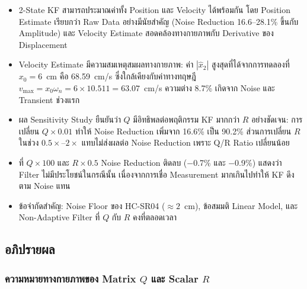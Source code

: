 \begin{itemize}
    \item 2-State KF สามารถประมาณค่าทั้ง Position และ Velocity ได้พร้อมกัน
          โดย Position Estimate เรียบกว่า Raw Data อย่างมีนัยสำคัญ
          (Noise Reduction 16.6--28.1\% ขึ้นกับ Amplitude)
          และ Velocity Estimate สอดคล้องทางกายภาพกับ Derivative ของ Displacement

    \item Velocity Estimate มีความสมเหตุสมผลทางกายภาพ:
          ค่า $|\hat{x}_2|$ สูงสุดที่ได้จากการทดลองที่ $x_0 = 6$~cm
          คือ 68.59~cm/s ซึ่งใกล้เคียงกับค่าทางทฤษฎี
          $v_\text{max} = x_0 \omega_n = 6 \times 10.511 = 63.07$~cm/s
          ความต่าง 8.7\% เกิดจาก Noise และ Transient ช่วงแรก

    \item ผล Sensitivity Study ยืนยันว่า $Q$ มีอิทธิพลต่อพฤติกรรม KF
          มากกว่า $R$ อย่างชัดเจน: การเปลี่ยน $Q \times 0.01$ ทำให้
          Noise Reduction เพิ่มจาก 16.6\% เป็น 90.2\%
          ส่วนการเปลี่ยน $R$ ในช่วง $0.5\times$--$2\times$ แทบไม่ส่งผลต่อ
          Noise Reduction เพราะ Q/R Ratio เปลี่ยนน้อย

    \item ที่ $Q \times 100$ และ $R \times 0.5$ Noise Reduction ติดลบ
          ($-$0.7\% และ $-$0.9\%) แสดงว่า Filter ไม่มีประโยชน์ในกรณีนั้น
          เนื่องจากการเชื่อ Measurement มากเกินไปทำให้ KF ดึงตาม Noise แทน

    \item ข้อจำกัดสำคัญ: Noise Floor ของ HC-SR04 ($\approx 2$~cm),
          ข้อสมมติ Linear Model, และ Non-Adaptive Filter
          ที่ $Q$ กับ $R$ คงที่ตลอดเวลา
\end{itemize}

\subsection{อภิปรายผล}

\subsubsection{ความหมายทางกายภาพของ Matrix $Q$ และ Scalar $R$}

